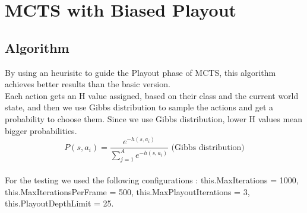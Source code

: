 \documentclass{article}
\begin{document}
  \section{MCTS with Biased Playout}
  \subsection{Algorithm}
  By using an heurisitc to guide the Playout phase of MCTS, this algorithm achieves better results than the basic version.\\
  Each action gets an H value assigned, based on their class and the current world state, and then we use Gibbs distribution to sample the actions and get a probability to choose them. 
  Since we use Gibbs distribution, lower H values mean bigger probabilities.\\
  \[P(s,a_i) = \frac{e^{-h(s, a_i)}}{\sum_{j=1}^{A}e^{-h(s, a_i)}} \text{     (Gibbs distribution)} \] \\
  For the testing we used the following configurations : this.MaxIterations = 1000, this.MaxIterationsPerFrame = 500, this.MaxPlayoutIterations = 3,
  this.PlayoutDepthLimit = 25.
  
\end{document}

